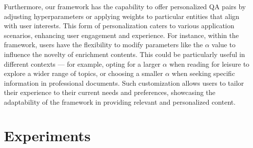 \documentclass[11pt]{article}
\begin{document}
Furthermore, our framework has the capability to offer personalized QA pairs by adjusting hyperparameters or applying weights to particular entities that align with user interests. This form of personalization caters to various application scenarios, enhancing user engagement and experience. For instance, within the framework, users have the flexibility to modify parameters like the $\alpha$ value to influence the novelty of enrichment contents. This could be particularly useful in different contexts — for example, opting for a larger $\alpha$ when reading for leisure to explore a wider range of topics, or choosing a smaller $\alpha$ when seeking specific information in professional documents. Such customization allows users to tailor their experience to their current needs and preferences, showcasing the adaptability of the framework in providing relevant and personalized content.

\section{Experiments}



\end{document}
